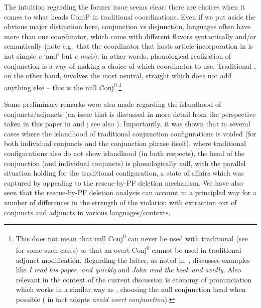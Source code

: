 \documentclass[output=paper]{langsci/langscibook}
\begin{document}
\largerpage[-2]
The intuition regarding the former issue seems clear: there are choices when it
comes to what heads ConjP in traditional coordinations. Even if we put aside the
obvious major distinction here, conjunction vs disjunction, languages often
have more than one coordinator, which come with different flavors syntactically
and/or semantically (note e.g.\ that the coordinator that hosts article
incorporation in  is not simple \emph{e} ‘and’ but \emph{e mais}); in
other words, phonological realization of conjunction is a way of making a
choice of which coordinator to use. Traditional , on the other
hand, involves the most neutral, straight  which does not add
anything else – this is the null Conj\textsuperscript{0}.\footnote{This does
    not mean that null Conj\textsuperscript{0} can never be used with
    traditional  (see \citealt{Progovac1999} for some such
    cases) or that an overt Conj\textsuperscript{0} cannot be used in
    traditional adjunct modification.  Regarding the latter, as noted
    in~, \textcite{Progovac1998,Progovac1999} discusses examples
    like \emph{I read his paper, and quickly} and \emph{John read the book and
    avidly}. Also relevant in the context of the current discussion is
     economy of pronunciation which works in a similar
way as  \emph{}, choosing the
null conjunction head when possible (\citealt{Progovac1998} in fact adopts
\emph{avoid overt conjunction}).\label{fn:27}}

Some preliminary remarks were also made regarding the islandhood of
conjuncts/adjuncts (an issue that is discussed in more detail from the
perspective taken in this paper in \citealt{Oda:2017} and
\citealt{Boskovic2017}; see also \citealt{Boskovicinprep}). Importantly, it was
shown that in several cases where the islandhood of traditional conjunction
configurations is voided (for both individual conjuncts and the conjunction
phrase itself), where traditional  configurations also do not show
islandhood (in both respects), the head of the conjunction (and individual
conjuncts) is phonologically null, with the parallel situation holding for the
traditional  configuration, a state of affairs which was
captured by appealing to the rescue-by-\gls{PF} deletion mechanism. We have
also seen that the rescue-by-PF deletion analysis can account in a principled
way for a number of differences in the strength of the violation with
extraction out of conjuncts and adjuncts in various
languages/contexts.
\end{document}
